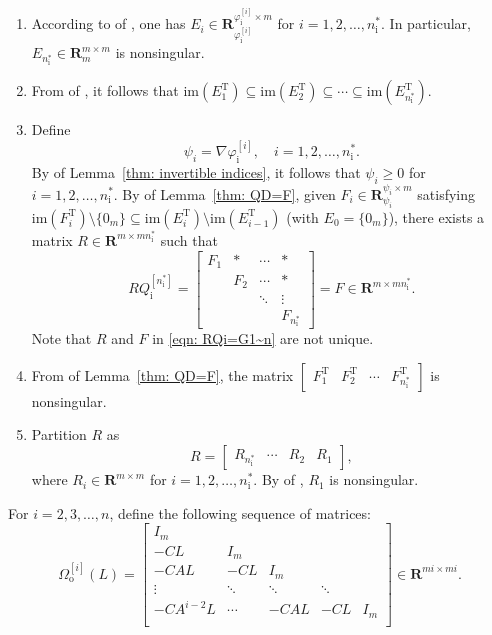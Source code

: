 \documentclass[sort&compress]{elsarticle}
\newcommand\faii{\varphi_\mathrm i}
\newcommand\nsharp{n_\mathrm i^*}
\newcommand\Pio{\mathit\Omega_\mathrm o}
\newcommand\Qi{Q_\mathrm i}
\newcommand\im{\mathrm{im}}
\newcommand\R{\mathbf R}
\newcommand\T{\mathrm T}
\begin{document}
\begin{enumerate}
\item According to  of ,
one has $E_i \in \R^{\faii^{[i]} \times m}_{\faii^{[i]}}$
for $i=1,2,\dots,\nsharp$.
In particular, $E_{\nsharp} \in \R^{m \times m}_m$ is nonsingular.
\item From  of , it follows that
$\im(E_1^\T) \subseteq \im(E_2^\T) \subseteq \cdots \subseteq \im(E_{\nsharp}^\T)$.
\item
Define
\begin{equation}\label{eqn: define psii}
\psi_i = \nabla\faii^{[i]},\quad i=1,2,\dots,\nsharp.
\end{equation}
By  of Lemma~\ref{thm: invertible indices},
it follows that $\psi_i \ge 0$ for $i=1,2,\dots,\nsharp$.
By  of Lemma~\ref{thm: QD=F},
given $F_i \in \R^{\psi_i \times m}_{\psi_i}$ satisfying $\im(F_i^\T) \setminus \{0_m\} \subseteq \im(E_i^\T) \setminus \im(E_{i-1}^\T)$ (with $E_0 = \{0_m\}$),
there exists a matrix $R \in \R^{m \times m\nsharp}$
such that
\begin{equation}\label{eqn: RQi=G1~n}
R\Qi^{[\nsharp]}=\begin{bmatrix}
F_1&*&\cdots&*\\
&F_2&\cdots&*\\
&&\ddots&\vdots\\
&&&F_{\nsharp}
\end{bmatrix}=F \in \R^{m \times m\nsharp}.
\end{equation}
Note that $R$ and $F$ in \eqref{eqn: RQi=G1~n} are not unique.
\item From  of Lemma~\ref{thm: QD=F},
the matrix $\begin{bmatrix} F_1^\T & F_2^\T & \cdots & F_{\nsharp}^\T \end{bmatrix}$
is nonsingular.
\item
Partition $R$ as
\begin{equation}\label{eqn: partition R}
R = \begin{bmatrix} R_{\nsharp} & \cdots & R_2 & R_1 \end{bmatrix},
\end{equation}
where $R_i \in \R^{m \times m}$ for $i=1,2,\dots,\nsharp$.
By  of , $R_1$ is nonsingular.
\end{enumerate}
For $i=2,3,\dots,n$, define the following sequence of matrices:
\begin{equation*}
\Pio^{[i]}(L)
= \begin{bmatrix}
I_m & & & & \\
-CL & I_m & & & \\
-CAL & -CL & I_m & & \\
\vdots & \ddots & \ddots & \ddots & \\
-CA^{i-2}L & \cdots & -CAL & -CL & I_m \\
\end{bmatrix}
\in \R^{mi \times mi}.
\end{equation*}
\end{document}

